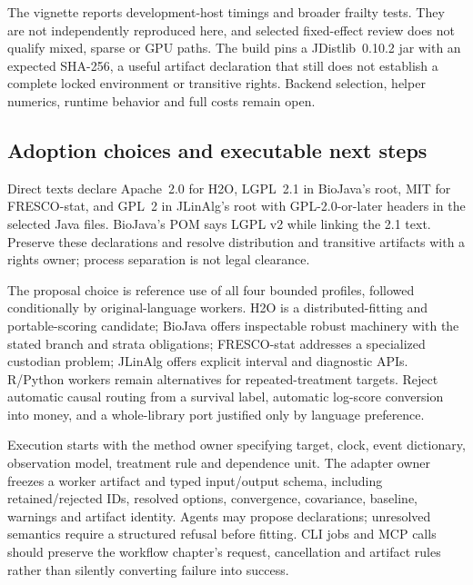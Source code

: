 The vignette reports development-host timings and broader frailty tests.
They are not independently reproduced here, and selected fixed-effect review
does not qualify mixed, sparse or GPU paths. The build pins a JDistlib~0.10.2
jar with an expected SHA-256, a useful artifact declaration that still does
not establish a complete locked environment or transitive rights. Backend
selection, helper numerics, runtime behavior and full costs remain open.
\citep{exec24_longjava_jlinalg}

\subsection{Adoption choices and executable next steps}
Direct texts declare Apache~2.0 for H2O, LGPL~2.1 in BioJava's root,
MIT for FRESCO-stat, and GPL~2 in JLinAlg's root with GPL-2.0-or-later
headers in the selected Java files. BioJava's POM says LGPL v2 while linking
the 2.1 text. Preserve these declarations and resolve distribution and
transitive artifacts with a rights owner; process separation is not legal
clearance. \citep{exec24_longjava_h2o,exec24_longjava_biojava,exec24_longjava_fresco,exec24_longjava_jlinalg}

The proposal choice is reference use of all four bounded profiles, followed
conditionally by original-language workers. H2O is a distributed-fitting and
portable-scoring candidate; BioJava offers inspectable robust machinery with
the stated branch and strata obligations; FRESCO-stat addresses a specialized
custodian problem; JLinAlg offers explicit interval and diagnostic APIs.
R/Python workers remain alternatives for repeated-treatment targets.
Reject automatic causal routing from a survival label, automatic log-score
conversion into money, and a whole-library port justified only by language
preference. \citep{exec24_longjava_h2o,exec24_longjava_biojava,exec24_longjava_fresco,exec24_longjava_jlinalg}

Execution starts with the method owner specifying target, clock, event
dictionary, observation model, treatment rule and dependence unit. The
adapter owner freezes a worker artifact and typed input/output schema,
including retained/rejected IDs, resolved options, convergence, covariance,
baseline, warnings and artifact identity. Agents may propose declarations;
unresolved semantics require a structured refusal before fitting. CLI jobs
and MCP calls should preserve the workflow chapter's request, cancellation
and artifact rules rather than silently converting failure into success.

